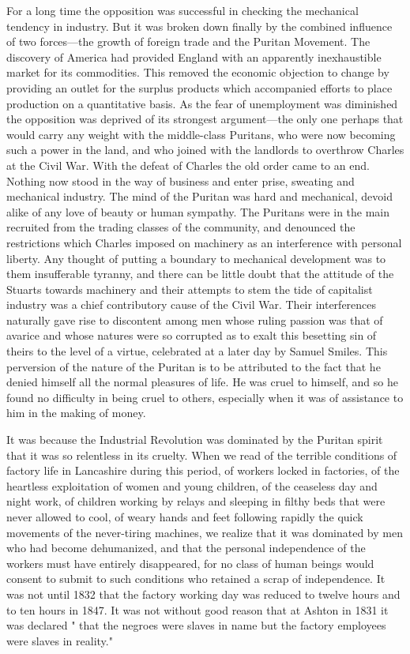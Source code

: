 \documentclass{book}
\begin{document}
For a long time the opposition was successful in checking the mechanical tendency in industry. But it was broken down finally by the combined influence of two forces—the growth of foreign trade and the Puritan Movement. The discovery of America had provided England with an apparently inexhaustible market for its commodities. This removed the economic objection to change by providing an outlet for the surplus products which accompanied efforts to place production on a quantitative basis. As the fear of unemployment was diminished the opposition was deprived of its strongest argument—the only one perhaps that would carry any weight with the middle-class Puritans, who were now becoming such a power in the land, and who joined with the landlords to overthrow Charles at the Civil War. With the defeat of Charles the old order came to an end. Nothing now stood in the way of business and enter prise, sweating and mechanical industry. The mind of the Puritan was hard and mechanical, devoid alike of any love of beauty or human sympathy. The Puritans were in the main recruited from the trading classes of the community, and denounced the restrictions which Charles imposed on machinery as an interference with personal liberty. Any thought of putting a boundary to mechanical development was to them insufferable tyranny, and there can be little doubt that the attitude of the Stuarts towards machinery and their attempts to stem the tide of capitalist industry was a chief contributory cause of the Civil War. Their interferences naturally gave rise to discontent among men whose ruling passion was that of avarice and whose natures were so corrupted as to exalt this besetting sin of theirs to the level of a virtue, celebrated at a later day by Samuel Smiles. This perversion of the nature of the Puritan is to be attributed to the fact that he denied himself all the normal pleasures of life. He was cruel to himself, and so he found no difficulty in being cruel to others, especially when it was of assistance to him in the making of money.

It was because the Industrial Revolution was dominated by the Puritan spirit that it was so relentless in its cruelty. When we read of the terrible conditions of factory life in Lancashire during this period, of workers locked in factories, of the heartless exploitation of women and young children, of the ceaseless day and night work, of children working by relays and sleeping in filthy beds that were never allowed to cool, of weary hands and feet following rapidly the quick movements of the never-tiring machines, we realize that it was dominated by men who had become dehumanized, and that the personal independence of the workers must have entirely disappeared, for no class of human beings would consent to submit to such conditions who retained a scrap of independence. It was not until 1832 that the factory working day was reduced to twelve hours and to ten hours in 1847. It was not without good reason that at Ashton in 1831 it was declared " that the negroes were slaves in name but the factory employees were slaves in reality."\footnotemark[3]
\end{document}
